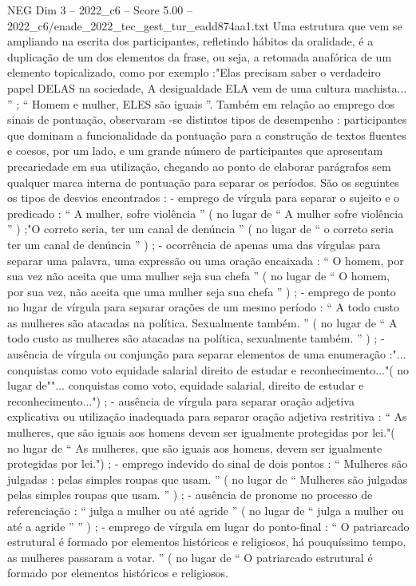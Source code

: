 \begin{textsample}{NEG Dim 3 – 2022\_c6 – Score 5.00 – 2022\_c6/enade\_2022\_tec\_gest\_tur\_eadd874aa1.txt}
Uma estrutura que vem se ampliando na escrita dos participantes, refletindo hábitos da oralidade, é a duplicação de um dos elementos da frase, ou seja, a retomada anafórica de um elemento topicalizado, como por exemplo :"Elas precisam saber o verdadeiro papel DELAS na sociedade, A desigualdade ELA vem de uma cultura machista... ” ; “ Homem e mulher, ELES são iguais ”.
Também em relação ao emprego dos sinais de pontuação, observaram -se distintos tipos de desempenho : participantes que dominam a funcionalidade da pontuação para a construção de textos fluentes e coesos, por um lado, e um grande número de participantes que apresentam precariedade em sua utilização, chegando ao ponto de elaborar parágrafos sem qualquer marca interna de pontuação para separar os períodos.
São os seguintes os tipos de desvios encontrados : - emprego de vírgula para separar o sujeito e o predicado : “ A mulher, sofre violência ” ( no lugar de “ A mulher sofre violência ” ) ;"O correto seria, ter um canal de denúncia ” ( no lugar de “ o correto seria ter um canal de denúncia ” ) ; - ocorrência de apenas uma das vírgulas para separar uma palavra, uma expressão ou uma oração encaixada : “ O homem, por sua vez não aceita que uma mulher seja sua chefa ” ( no lugar de “ O homem, por sua vez, não aceita que uma mulher seja sua chefa ” ) ; - emprego de ponto no lugar de vírgula para separar orações de um mesmo período : “ A todo custo as mulheres são atacadas na política.
Sexualmente também. ” ( no lugar de “ A todo custo as mulheres são atacadas na política, sexualmente também. ” ) ; - ausência de vírgula ou conjunção para separar elementos de uma enumeração :"... conquistas como voto equidade salarial direito de estudar e reconhecimento..."( no lugar de""... conquistas como voto, equidade salarial, direito de estudar e reconhecimento...") ; - ausência de vírgula para separar oração adjetiva explicativa ou utilização inadequada para separar oração adjetiva restritiva : “ As mulheres, que são iguais aos homens devem ser igualmente protegidas por lei."( no lugar de “ As mulheres, que são iguais aos homens, devem ser igualmente protegidas por lei.") ; - emprego indevido do sinal de dois pontos : “ Mulheres são julgadas : pelas simples roupas que usam. ” ( no lugar de “ Mulheres são julgadas pelas simples roupas que usam. ” ) ; - ausência de pronome no processo de referenciação : “ julga a mulher ou até agride ” ( no lugar de “ julga a mulher ou até a agride ” ” ) ; - emprego de vírgula em lugar do ponto-final : “ O patriarcado estrutural é formado por elementos históricos e religiosos, há pouquíssimo tempo, as mulheres passaram a votar. ” ( no lugar de “ O patriarcado estrutural é formado por elementos históricos e religiosos.

\end{textsample}
